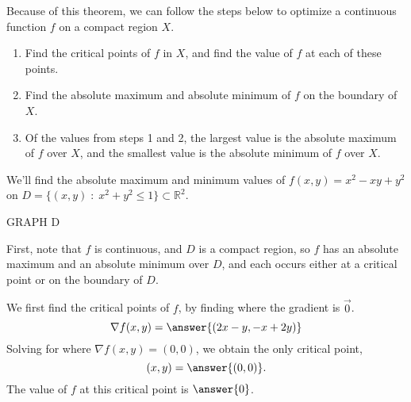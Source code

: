\documentclass{ximera}
\begin{document}
Because of this theorem, we can follow the steps below to optimize a continuous function $f$ on a compact region $X$.
\begin{enumerate}
\item Find the critical points of $f$ in $X$, and find the value of $f$ at each of these points.
\item Find the absolute maximum and absolute minimum of $f$ on the boundary of $X$.
\item Of the values from steps 1 and 2, the largest value is the absolute maximum of $f$ over $X$, and the smallest value is the absolute minimum of $f$ over $X$.
\end{enumerate}

\begin{example}
We'll find the absolute maximum and minimum values of $f(x,y)= x^2-xy+y^2$ on $D=\{(x,y)\;:\;x^2+y^2\leq 1\}\subset \mathbb{R}^2$.

GRAPH D

First, note that $f$ is continuous, and $D$ is a compact region, so $f$ has an absolute maximum and an absolute minimum over $D$, and each occurs either at a critical point or on the boundary of $D$.

We first find the critical points of $f$, by finding where the gradient is $\vec{0}$.
\[
\nabla f(x,y) = \answer{(2x-y, -x+2y)}
\]
Solving for where $\nabla f(x,y) = (0,0)$, we obtain the only critical point,
\[
(x,y) = \answer{(0,0)}.
\]
The value of $f$ at this critical point is $\answer{0}$.


\end{example}
\end{document}
